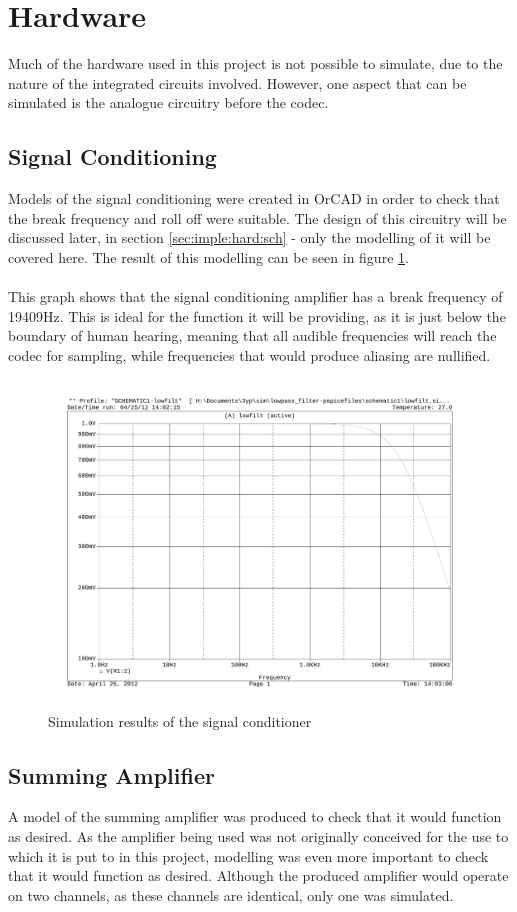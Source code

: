 \section{Hardware}
Much of the hardware used in this project is not possible to simulate, due to
the nature of the integrated circuits involved.
However, one aspect that can be simulated is the analogue circuitry before the
codec.

\subsection{Signal Conditioning}
Models of the signal conditioning were created in OrCAD in order to check that
the break frequency and roll off were suitable.
The design of this circuitry will be discussed later, in section
\ref{sec:imple:hard:sch} - only the modelling of it will be covered here.
The result of this modelling can be seen in figure \ref{fig:sigcondmodel}.
\\
\\
This graph shows that the signal conditioning amplifier has a break frequency
of 19409Hz.
This is ideal for the function it will be providing, as it is just below the
boundary of human hearing, meaning that all audible frequencies will reach 
the codec for sampling, while frequencies that would produce aliasing are
nullified.

\begin{figure}[H]
	\centering
	\includegraphics[width=\textwidth]{./img/signal_conditioning_sim.pdf}
	\caption{Simulation results of the signal conditioner}
	\label{fig:sigcondmodel}
\end{figure}

\subsection{Summing Amplifier}
A model of the summing amplifier was produced to check that it would function
as desired.
As the amplifier being used was not originally conceived for the use to which
it is put to in this project, modelling was even more important to check that
it would function as desired.
Although the produced amplifier would operate on two channels, as these channels
are identical, only one was simulated.

